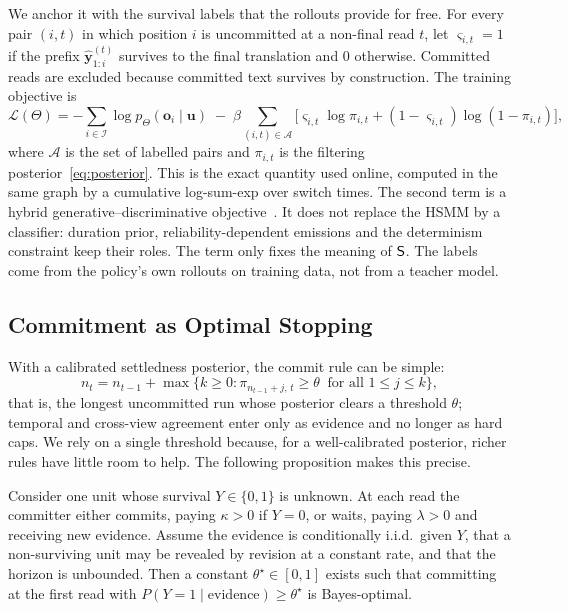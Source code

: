 We anchor it with the survival labels that the rollouts provide for free.
For every pair $(i,t)$ in which position $i$ is uncommitted at a non-final read $t$, let $\varsigma_{i,t} = 1$ if the prefix $\hat{\bm{y}}^{(t)}_{1:i}$ survives to the final translation and $0$ otherwise.
Committed reads are excluded because committed text survives by construction.
The training objective is
\begin{equation}
\mathcal{L}(\Theta) = -\sum_{i \in \mathcal{I}} \log p_\Theta(\bm{o}_i \mid \bm{u})
\;-\; \beta \sum_{(i,t) \in \mathcal{A}} \Big[\varsigma_{i,t} \log \pi_{i,t} + (1 - \varsigma_{i,t}) \log (1 - \pi_{i,t})\Big],
\label{eq:anchor}
\end{equation}
where $\mathcal{A}$ is the set of labelled pairs and $\pi_{i,t}$ is the filtering posterior~\eqref{eq:posterior}.
This is the exact quantity used online, computed in the same graph by a cumulative log-sum-exp over switch times.
The second term is a hybrid generative--discriminative objective~\citep{bishop2007generative}.
It does not replace the HSMM by a classifier: duration prior, reliability-dependent emissions and the determinism constraint keep their roles.
The term only fixes the meaning of $\mathsf{S}$.
The labels come from the policy's own rollouts on training data, not from a teacher model.

\subsection{Commitment as Optimal Stopping}
\label{sec:rule}

With a calibrated settledness posterior, the commit rule can be simple:
\begin{equation}
n_t = n_{t-1} + \max\big\{k \ge 0 : \pi_{n_{t-1}+j,\,t} \ge \theta \ \text{ for all } 1 \le j \le k\big\},
\label{eq:rule}
\end{equation}
that is, the longest uncommitted run whose posterior clears a threshold $\theta$; temporal and cross-view agreement enter only as evidence and no longer as hard caps.
We rely on a single threshold because, for a well-calibrated posterior, richer rules have little room to help.
The following proposition makes this precise.

\begin{proposition}
\label{prop:threshold}
Consider one unit whose survival $Y \in \{0,1\}$ is unknown.
At each read the committer either commits, paying $\kappa > 0$ if $Y = 0$, or waits, paying $\lambda > 0$ and receiving new evidence.
Assume the evidence is conditionally i.i.d.\ given $Y$, that a non-surviving unit may be revealed by revision at a constant rate, and that the horizon is unbounded.
Then a constant $\theta^\star \in [0,1]$ exists such that committing at the first read with $P(Y = 1 \mid \text{evidence}) \ge \theta^\star$ is Bayes-optimal.
\end{proposition}

